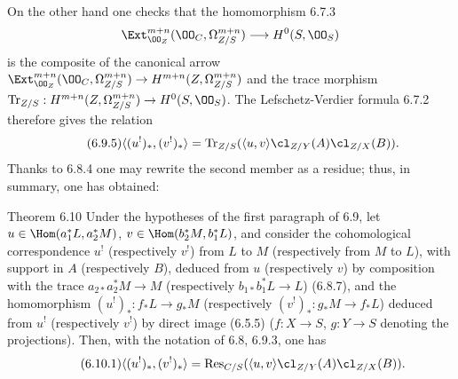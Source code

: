 On the other hand one checks that the homomorphism 6.7.3
\[
\Ext^{m+n}_{\OO_Z}(\OO_C,\Omega^{m+n}_{Z/S})\longrightarrow H^0(S,\OO_S)
\]
is the composite of the canonical arrow $\Ext^{m+n}_{\OO_Z}(\OO_C,\Omega^{m+n}_{Z/S})\to H^{m+n}(Z,\Omega^{m+n}_{Z/S})$ and the trace morphism $\operatorname{Tr}_{Z/S}:H^{m+n}(Z,\Omega^{m+n}_{Z/S})\to H^0(S,\OO_S)$. The Lefschetz-Verdier formula 6.7.2 therefore gives the relation
\begin{equation}
\tag{6.9.5}
\langle (u^!)_*,(v^!)_*\rangle=\operatorname{Tr}_{Z/S}(\langle u,v\rangle\cl_{Z/Y}(A)\cl_{Z/X}(B)).
\end{equation}
Thanks to 6.8.4 one may rewrite the second member as a residue; thus, in summary, one has obtained:


\begin{statement}{Theorem 6.10}
Under the hypotheses of the first paragraph of 6.9, let $u\in\Hom(a_1^*L,a_2^*M)$, $v\in\Hom(b_2^*M,b_1^*L)$, and consider the cohomological correspondence $u^!$ (respectively $v^!$) from $L$ to $M$ (respectively from $M$ to $L$), with support in $A$ (respectively $B$), deduced from $u$ (respectively $v$) by composition with the trace $a_{2*}a_2^*M\to M$ (respectively $b_{1*}b_1^*L\to L$) (6.8.7), and the homomorphism $(u^!)_*:f_*L\to g_*M$ (respectively $(v^!)_*:g_*M\to f_*L$) deduced from $u^!$ (respectively $v^!$) by direct image (6.5.5) ($f:X\to S$, $g:Y\to S$ denoting the projections). Then, with the notation of 6.8, 6.9.3, one has
\begin{equation}
\tag{6.10.1}
\langle (u^!)_*,(v^!)_*\rangle=\operatorname{Res}_{C/S}(\langle u,v\rangle\cl_{Z/Y}(A)\cl_{Z/X}(B)).
\end{equation}
\end{statement}

